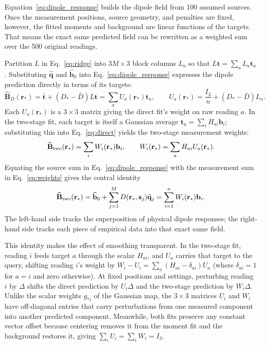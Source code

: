 \documentclass[11pt]{article}
\newcommand{\B}{\mathbf B}
\newcommand{\rr}{\mathbf r}
\newcommand{\bvec}{\mathbf b}
\begin{document}
Equation~\eqref{eq:dipole_response} builds the dipole field from 100 assumed
sources. Once the measurement positions, source geometry, and penalties are
fixed, however, the fitted moments and background are linear functions of the
targets. That means the exact same predicted field can be rewritten as a
weighted sum over the 500 original readings.

Partition \(L\) in Eq.~\eqref{eq:ridge} into \(3M\times3\) block columns
\(L_a\) so that \(L\mathbf t=\sum_a L_a\mathbf t_a\). Substituting
\(\widehat{\mathbf q}\) and \(\widehat{\bvec}_0\) into
Eq.~\eqref{eq:dipole_response} expresses the dipole prediction directly in
terms of its targets:
\begin{equation}
 \widehat{\B}_D(\rr_*)=\bar{\mathbf t}+(D_*-\bar D)L\mathbf t
  =\sum_a U_a(\rr_*)\mathbf t_a,\qquad
 U_a(\rr_*)=\frac{I_3}{n}+(D_*-\bar D)L_a.
 \label{eq:direct}
\end{equation}
Each \(U_a(\rr_*)\) is a \(3\times3\) matrix giving the direct fit's weight on
raw reading \(a\). In the two-stage fit, each target is itself a Gaussian
average \(\mathbf t_a=\sum_i H_{ai}\bvec_i\); substituting this into
Eq.~\eqref{eq:direct} yields the two-stage measurement weights:
\begin{equation}
 \widehat{\B}_{\rm two}(\rr_*)=\sum_i W_i(\rr_*)\bvec_i,\qquad
 W_i(\rr_*)=\sum_a H_{ai}U_a(\rr_*).
 \label{eq:weights}
\end{equation}
Equating the source sum in Eq.~\eqref{eq:dipole_response} with the measurement
sum in Eq.~\eqref{eq:weights} gives the central identity
\begin{equation}
 \widehat{\B}_{\rm two}(\rr_*)=
 \widehat{\bvec}_0+\sum_{j=1}^{M}D(\rr_*,\mathbf s_j)\widehat{\mathbf q}_j
 =\sum_{i=1}^{n}W_i(\rr_*)\bvec_i .
 \label{eq:dipole_identity}
\end{equation}
The left-hand side tracks the superposition of physical dipole responses; the
right-hand side tracks each piece of empirical data into that exact same field.

This identity makes the effect of smoothing transparent. In the two-stage fit,
reading \(i\) feeds target \(a\) through the scalar \(H_{ai}\), and \(U_a\)
carries that target to the query, shifting reading \(i\)'s weight by
\(W_i-U_i=\sum_a(H_{ai}-\delta_{ai})U_a\) (where \(\delta_{ai}=1\) for \(a=i\)
and zero otherwise). At fixed positions and settings, perturbing reading \(i\)
by \(\Delta\) shifts the direct prediction by \(U_i\Delta\) and the two-stage
prediction by \(W_i\Delta\). Unlike the scalar weights \(g_{*i}\) of the
Gaussian map, the \(3\times3\) matrices \(U_i\) and \(W_i\) have off-diagonal
entries that carry perturbations from one measured component into another
predicted component. Meanwhile, both fits preserve any constant vector offset
because centering removes it from the moment fit and the background restores
it, giving \(\sum_i U_i=\sum_i W_i=I_3\).
\end{document}
